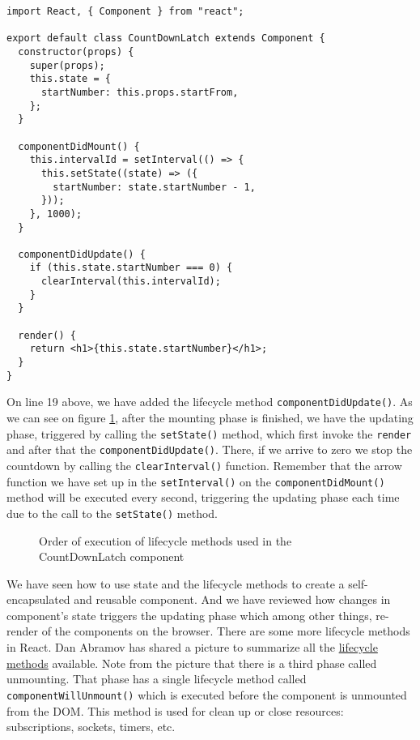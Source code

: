 \documentclass[a4paper, oneside, titlepage, 12pt]{book}
\begin{document}
\begin{verbatim}
import React, { Component } from "react";

export default class CountDownLatch extends Component {
  constructor(props) {
    super(props);
    this.state = {
      startNumber: this.props.startFrom,
    };
  }

  componentDidMount() {
    this.intervalId = setInterval(() => {
      this.setState((state) => ({
        startNumber: state.startNumber - 1,
      }));
    }, 1000);
  }

  componentDidUpdate() {
    if (this.state.startNumber === 0) {
      clearInterval(this.intervalId);
    }
  }
  
  render() {
    return <h1>{this.state.startNumber}</h1>;
  }
}
\end{verbatim}

On line 19 above, we have added the lifecycle method \texttt{componentDidUpdate()}. As we can see on figure \ref{fig:lifecy}, after the mounting phase is finished, we have the updating phase, triggered by calling the \texttt{setState()} method, which first invoke the \texttt{render} and after that the \texttt{componentDidUpdate()}. There, if we arrive to zero we stop the countdown by calling the \texttt{clearInterval()} function. Remember that the arrow function we have set up in the \texttt{setInterval()} on the \texttt{componentDidMount()} method will be executed every second, triggering the updating phase each time due to the call to the \texttt{setState()} method.

\begin{figure}[htbp]
  \centering
  
  \caption{Order of execution of lifecycle methods used in the CountDownLatch component}
   \label{fig:lifecy}
\end{figure}

We have seen how to use state and the lifecycle methods to create a self-encapsulated and reusable component. And we have reviewed how changes in component's state triggers the updating phase which among other things, re-render of the components on the browser. There are some more lifecycle methods in React. Dan Abramov has shared a picture to summarize all the \href{https://twitter.com/dan_abramov/status/981712092611989509/photo/1}{lifecycle methods} available. Note from the picture that there is a third phase called unmounting. That phase has a single  lifecycle method called \texttt{componentWillUnmount()} which is executed before the component is unmounted from the DOM. This method is used for clean up or close resources: subscriptions, sockets, timers, etc.
\newline
\end{document}
